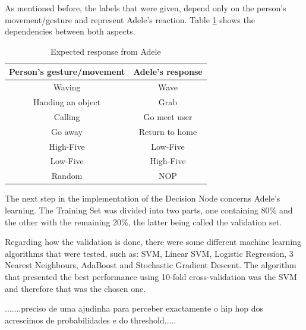 As mentioned before, the labels that were given, depend only on the person's movement/gesture and represent Adele's reaction. Table \color{red}\ref{tab:expected_response} \color{black} shows the dependencies between both aspects.
\begin{table}[!h]
\centering
\label{tab:expected_response}
\begin{tabular}{|c|c|}
\hline
\textbf{Person's gesture/movement} & \textbf{Adele's response} \\ \hline
Waving                           & Wave                                 \\
Handing an object                & Grab                            		\\
Calling                          & Go meet user                         \\
Go away                          & Return to home                       \\
High-Five                        & Low-Five                             \\
Low-Five                         & High-Five                            \\
Random                           & NOP                                  \\ \hline
\end{tabular}
\caption{Expected response from Adele}
\end{table}

The next step in the implementation of the Decision Node concerns Adele's learning. The Training Set was divided into two parts, one containing 80\% and the other with the remaining 20\%, the latter being called the validation set.

Regarding how the validation is done, there were some different machine learning algorithms that were tested, such as: SVM, Linear SVM, Logistic Regression, 3 Nearest Neighbours, AdaBoost and Stochastic Gradient Descent. The algorithm that presented the best performance using 10-fold cross-validation was the SVM and therefore that was the chosen one.

\color{red}
.......preciso de uma ajudinha para perceber exactamente o hip hop dos acrescimos de probabilidades e do threshold.....
\color{black}

